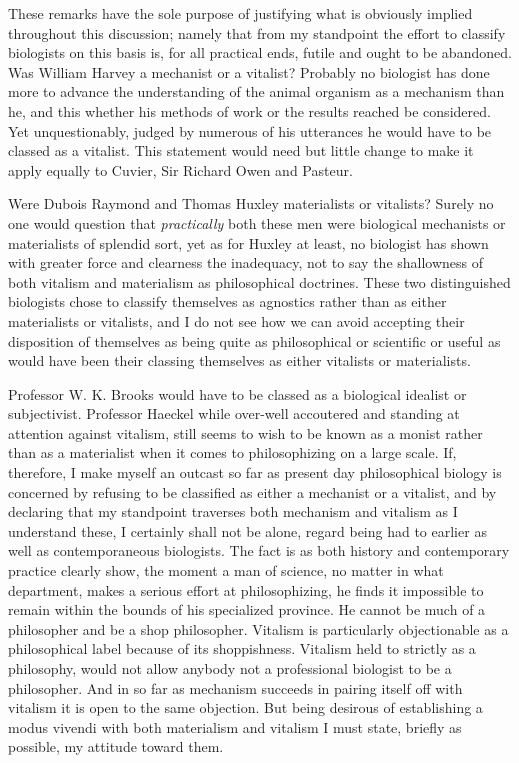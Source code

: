 \documentclass[a4paper, 11pt, oneside, polutonikogreek, english, landscape]{article}
\begin{document}
These remarks have the sole purpose of justifying what is obviously implied throughout this discussion; namely that from my standpoint the effort to classify biologists on this basis is, for all practical ends, futile and ought to be abandoned. Was William Harvey a mechanist or a vitalist? Probably no biologist has done more to advance the understanding of the animal organism as a mechanism than he, and this whether his methods of work or the results reached be considered. Yet unquestionably, judged by numerous of his utterances he would have to be classed as a vitalist. This statement would need but little change to make it apply equally to Cuvier, Sir Richard Owen and Pasteur.

Were Dubois Raymond and Thomas Huxley materialists or vitalists? Surely no one would question that \emph{practically} both these men were biological mechanists or materialists of splendid sort, yet as for Huxley at least, no biologist has shown with greater force and clearness the inadequacy, not to say the shallowness of both vitalism and materialism as philosophical doctrines. These two distinguished biologists chose to classify themselves as agnostics rather than as either materialists or vitalists, and I do not see how we can avoid accepting their disposition of themselves as being quite as philosophical or scientific or useful as would have been their classing themselves as either vitalists or materialists.

Professor W. K. Brooks would have to be classed as a biological idealist or subjectivist. Professor Haeckel while over-well accoutered and standing at attention against vitalism, still seems to wish to be known as a monist rather than as a materialist when it comes to philosophizing on a large scale. If, therefore, I make myself an outcast so far as present day philosophical biology is concerned by refusing to be classified as either a mechanist or a vitalist, and by declaring that my standpoint traverses both mechanism and vitalism as I understand these, I certainly shall not be alone, regard being had to earlier as well as contemporaneous biologists. The fact is as both history and contemporary practice clearly show, the moment a man of science, no matter in what department, makes a serious effort at philosophizing, he finds it impossible to remain within the bounds of his specialized province. He cannot be much of a philosopher and be a shop philosopher. Vitalism is particularly objectionable as a philosophical label because of its shoppishness. Vitalism held to strictly as a philosophy, would not allow anybody not a professional biologist to be a philosopher. And in so far as mechanism succeeds in pairing itself off with vitalism it is open to the same objection. But being desirous of establishing a modus vivendi with both materialism and vitalism I must state, briefly as possible, my attitude toward them.
\end{document}
